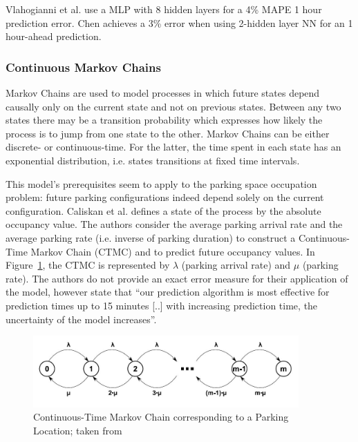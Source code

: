 \documentclass{article}
\begin{document}
\vspace{2mm}
Vlahogianni et al.\cite{Vlahogianni} use a MLP with 8 hidden layers for a 4\% MAPE 1 hour prediction error. Chen\cite{Chen} achieves a 3\% error when using 2-hidden layer NN for an 1 hour-ahead prediction.

\subsubsection{Continuous Markov Chains}
Markov Chains are used to model processes in which future states depend causally only on the current state and not on previous states. Between any two states there may be a transition probability which expresses how likely the process is to jump from one state to the other. Markov Chains can be either discrete- or continuous-time. For the latter, the time spent in each state has an exponential distribution, i.e. states transitions at fixed time intervals.

\vspace{2mm}
This model's prerequisites seem to apply to the parking space occupation problem: future parking configurations indeed depend solely on the current configuration. Caliskan et al.\cite{Caliskan2007} defines a state of the process by the absolute occupancy value. The authors consider the average parking arrival rate and the average parking rate (i.e. inverse of parking duration) to construct a Continuous-Time Markov Chain (CTMC) and to predict future occupancy values. In Figure~\ref{fig:markov-chain}, the CTMC is represented by $\lambda$ (parking arrival rate) and $\mu$ (parking rate). The authors do not provide an exact error measure for their application of the model, however state that ``our prediction algorithm is most effective for prediction times up to 15 minutes [..] with increasing prediction time, the uncertainty of the model increases''.

\begin{figure}[!ht]
    \centering
    \includegraphics[width=4.0in]{markov-chain}
    \caption{Continuous-Time Markov Chain corresponding to a Parking Location; taken from \cite{Caliskan2007}}
    \label{fig:markov-chain}
\end{figure}
\end{document}

